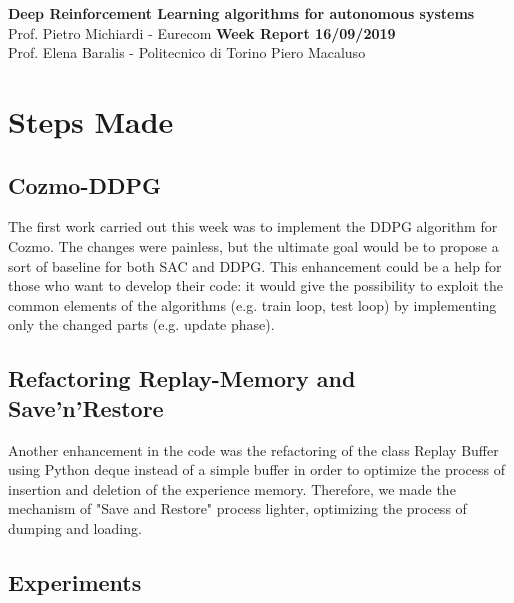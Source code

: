 \documentclass[a4paper, 11pt]{article}
\begin{document}
	\noindent
	\large\textbf{Deep Reinforcement Learning algorithms for autonomous systems}  \\
	\normalsize Prof. Pietro Michiardi - Eurecom \hfill \textbf{Week Report 16/09/2019}\\
	\normalsize Prof. Elena Baralis - Politecnico di Torino  \hfill Piero Macaluso
	
		\tableofcontents
	\section{Steps Made}
	
	 
	\subsection{Cozmo-DDPG}
	
	The first work carried out this week was to implement the DDPG algorithm for Cozmo. The changes were painless, but the ultimate goal would be to propose a sort of baseline for both SAC and DDPG. This enhancement could be a help for those who want to develop their code: it would give the possibility to exploit the common elements of the algorithms (e.g. train loop, test loop) by implementing only the changed parts (e.g. update phase). 
	
	\subsection{Refactoring Replay-Memory and Save'n'Restore}
	
	Another enhancement in the code was the refactoring of the class Replay Buffer using Python deque instead of a simple buffer in order to optimize the process of insertion and deletion of the experience memory. Therefore, we made the mechanism of "Save and Restore" process lighter, optimizing the process of dumping and loading.
	
	\subsection{Experiments}
	
	
	
	
	\newpage
	
	
\end{document}
